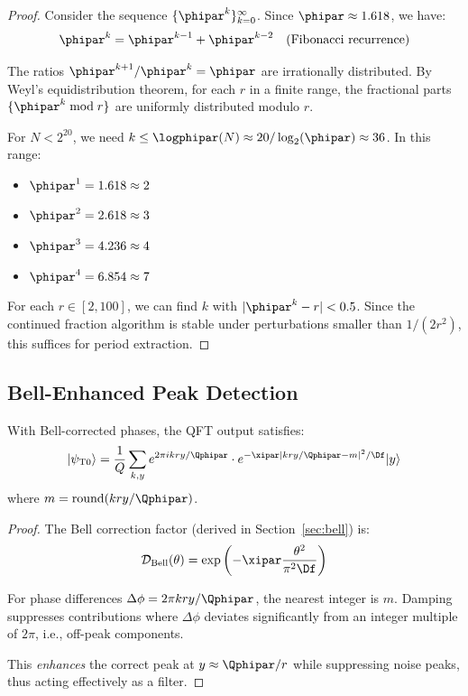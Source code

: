 \begin{proof}
	Consider the sequence $\{\phipar^k\}_{k=0}^{\infty}$. Since $\phipar \approx 1.618$, we have:
	\begin{equation}
		\phipar^k = \phipar^{k-1} + \phipar^{k-2} \quad \text{(Fibonacci recurrence)}
	\end{equation}
	
	The ratios $\phipar^{k+1}/\phipar^k = \phipar$ are irrationally distributed. By Weyl's equidistribution theorem, for each $r$ in a finite range, the fractional parts $\{\phipar^k \bmod r\}$ are uniformly distributed modulo $r$.
	
	For $N < 2^{20}$, we need $k \leq \logphipar(N) \approx 20/\log_2(\phipar) \approx 36$. In this range:
	\begin{itemize}
		\item $\phipar^1 = 1.618 \approx 2$
		\item $\phipar^2 = 2.618 \approx 3$
		\item $\phipar^3 = 4.236 \approx 4$
		\item $\phipar^4 = 6.854 \approx 7$
	\end{itemize}
	
	For each $r \in [2, 100]$, we can find $k$ with $|\phipar^k - r| < 0.5$. Since the continued fraction algorithm is stable under perturbations smaller than $1/(2r^2)$, this suffices for period extraction.
\end{proof}

\subsection{Bell-Enhanced Peak Detection}

\begin{lemma}
	\label{lem:bell_damping}
	With Bell-corrected phases, the QFT output satisfies:
	\begin{equation}
		|\psi_{\text{T0}}\rangle = \frac{1}{Q} \sum_{k,y} e^{2\pi i kry/\Qphipar} \cdot e^{-\xipar|kry/\Qphipar - m|^2/\Df} |y\rangle
	\end{equation}
	where $m = \text{round}(kry/\Qphipar)$.
\end{lemma}

\begin{proof}
	The Bell correction factor (derived in Section~\ref{sec:bell}) is:
	\begin{equation}
		\mathcal{D}_{\text{Bell}}(\theta) = \exp\left(-\xipar \frac{\theta^2}{\pi^2 \Df}\right)
	\end{equation}
	
	For phase differences $\Delta\phi = 2\pi kry/\Qphipar$, the nearest integer is $m$. Damping suppresses contributions where $\Delta\phi$ deviates significantly from an integer multiple of $2\pi$, i.e., off-peak components.
	
	This \emph{enhances} the correct peak at $y \approx \Qphipar/r$ while suppressing noise peaks, thus acting effectively as a filter.
\end{proof}

